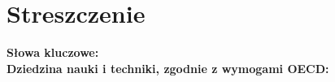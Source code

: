 \chapter*{Streszczenie}

\noindent\textbf{Słowa kluczowe:}  \\

\noindent\textbf{Dziedzina nauki i techniki, zgodnie z wymogami OECD:}
